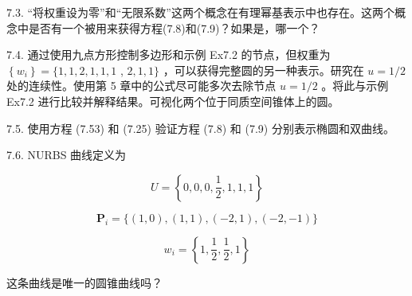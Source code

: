 \documentclass[../main.tex]{subfiles}
\begin{document}
7.3. “将权重设为零”和“无限系数”这两个概念在有理幂基表示中也存在。这两个概念中是否有一个被用来获得方程(7.8)和(7.9)？如果是，哪一个？

7.4. 通过使用九点方形控制多边形和示例 Ex7.2 的节点，但权重为 \(\left\{  {w}_{i}\right\}   = \{ 1,1,2,1,1,1\) , \(2,1,1\}\) ，可以获得完整圆的另一种表示。研究在 \(u = 1/2\) 处的连续性。使用第 5 章中的公式尽可能多次去除节点 \(u = 1/2\) 。将此与示例 Ex7.2 进行比较并解释结果。可视化两个位于同质空间锥体上的圆。

7.5. 使用方程 (7.53) 和 (7.25) 验证方程 (7.8) 和 (7.9) 分别表示椭圆和双曲线。

7.6. NURBS 曲线定义为

\[
U = \left\{  {0,0,0,\frac{1}{2},1,1,1}\right\}
\]

\[
{\mathbf{P}}_{i} = \{ \left( {1,0}\right) ,\left( {1,1}\right) ,\left( {-2,1}\right) ,\left( {-2, - 1}\right) \}
\]

\[
{w}_{i} = \left\{  {1,\frac{1}{2},\frac{1}{2},1}\right\}
\]

这条曲线是唯一的圆锥曲线吗？



\clearpage
\end{document}
